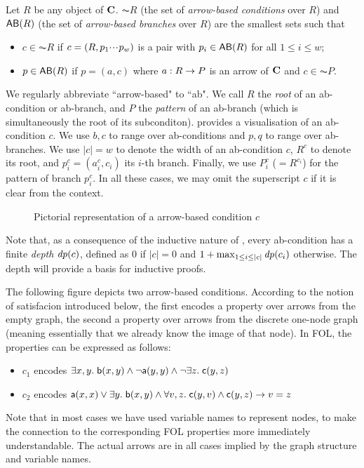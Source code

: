 \begin{definition}
  Let $R$ be any object of $\mathbf{C}$. $\AC R$ (the set of \emph{arrow-based conditions} over $R$) and $\AB R$ (the set of \emph{arrow-based branches} over $R$) are the smallest sets such that
  \begin{itemize}
  \item $c\in \AC R$ if $c=(R,p_1{\cdotp\mkern-2mu\cdotp\mkern-2mu\cdotp\mkern1mu} p_w)$ is a pair with $p_i\in \AB R$ for all $1\leq i\leq w$;
  \item $p\in \AB R$ if $p=(a,c)$ where $a: R\rightarrow P$ is an arrow of $\mathbf{C}$ and $c\in \AC P$.
  \end{itemize}
\end{definition}
%
We regularly abbreviate ``arrow-based" to ``ab". We call $R$ the \emph{root} of an ab-condition or ab-branch, and $P$ the \emph{pattern} of an ab-branch (which is simultaneously the root of its subconditon).  provides a visualisation of an ab-condition $c$. We use $b,c$ to range over ab-conditions and $p,q$ to range over ab-branches. We use $|c|=w$ to denote the width of an ab-condition $c$, $R^c$ to denote its root, and $p^c_i=(a^c_i,c_i)$ its $i$-th branch. Finally, we use $P^c_i$ ($=R^{c_i}$) for the pattern of branch $p^c_i$. In all these cases, we may omit the superscript $c$ if it is clear from the context.
%
\begin{figure}
  \centering
  
  \caption{Pictorial representation of a arrow-based condition $c$}
\end{figure}

Note that, as a consequence of the inductive nature of , every ab-condition has a finite \emph{depth} $\mathit{dp}(c)$, defined as $0$ if $|c|=0$ and $1+\max_{1\leq i\leq |c|} \mathit{dp}(c_i)$ otherwise. The depth will provide a basis for inductive proofs.

\begin{example}
The following figure depicts two arrow-based conditions. According to the notion of satisfacion introduced below, the first encodes a property over arrows from the empty graph, the second a property over arrows from the discrete one-node graph (meaning essentially that we already know the image of that node). In FOL, the properties can be expressed as follows:
\begin{itemize}
\item $c_1$ encodes $\exists x,y.\; \mathsf{b}(x,y) \wedge \neg \mathsf{a}(y,y)\wedge \neg \exists z.\; \mathsf{c}(y,z)$
\item $c_2$ encodes $\mathsf{a}(x,x)\vee \exists y.\; \mathsf{b}(x,y) \wedge \forall v,z.\; \mathsf{c}(y,v)\wedge \mathsf{c}(y,z) \rightarrow v=z$
\end{itemize}
Note that in most cases we have used variable names to represent nodes, to make the connection to the corresponding FOL properties more immediately understandable. The actual arrows are in all cases implied by the graph structure and variable names.
\begin{center}

\end{center}
\end{example}

